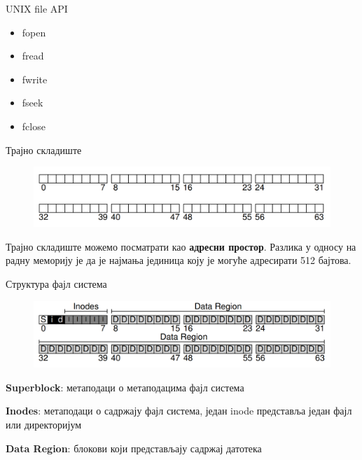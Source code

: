 \documentclass[xcolor=table]{beamer}
\begin{document}
    \begin{frame}{UNIX file API}
        \begin{itemize}
            \item fopen
            \item fread
            \item fwrite
            \item fseek
            \item fclose
        \end{itemize}
    \end{frame}
    
    \begin{frame}{Трајно складиште}
        \begin{figure}
            \includegraphics[width=\textwidth,height=0.8\textheight,keepaspectratio]{images/hdd_address_space.png}
            \label{fig:hdd_address_space.png}
        \end{figure}
        
        Трајно складиште можемо посматрати као \textbf{адресни простор}. Разлика у односу на радну меморију је да је најмања јединица коју
        је могуће адресирати 512 бајтова.
    \end{frame}
    
    \begin{frame}{Структура фајл система}
        \begin{figure}
            \includegraphics[width=\textwidth,height=0.8\textheight,keepaspectratio]{images/fs_structure.png}
            \label{fig:fs_structure.png}
        \end{figure}
        
        \textbf{Superblock}: метаподаци о метаподацима фајл система
        
        \textbf{Inodes}: метаподаци о садржају фајл система, један inode представља један фајл или директоријум
        
        \textbf{Data Region}: блокови који представљају садржај датотека
    \end{frame}
    
\end{document}
